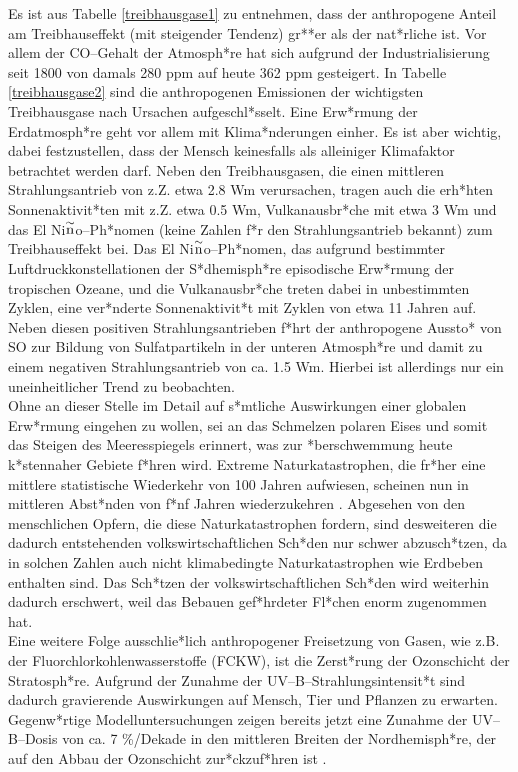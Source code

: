 Es ist aus Tabelle \ref{treibhausgase1} zu entnehmen, dass der
anthropogene Anteil am Treibhauseffekt (mit steigender Tendenz)
gr**er als der nat*rliche ist. Vor allem der CO--Gehalt
der Atmosph*re hat sich aufgrund der Industrialisierung seit 1800
von damals 280 ppm auf heute 362 ppm gesteigert. In Tabelle
\ref{treibhausgase2} sind die anthropogenen Emissionen der
wichtigsten Treibhausgase nach Ursachen aufgeschl*sselt. Eine
Erw*rmung der Erdatmosph*re geht vor allem mit Klima*nderungen
einher. Es ist aber wichtig, dabei festzustellen, dass der Mensch
keinesfalls als alleiniger Klimafaktor betrachtet werden darf.
Neben den Treibhausgasen, die einen mittleren Strahlungsantrieb
von z.Z. etwa 2.8 Wm verursachen, tragen auch die erh*hten
Sonnenaktivit*ten mit z.Z. etwa 0.5 Wm, Vulkanausbr*che mit
etwa 3 Wm und das El Ni$\rm \stackrel{\sim}{n}$o--Ph*nomen
(keine Zahlen f*r den Strahlungsantrieb bekannt) zum
Treibhauseffekt bei. Das El Ni$\rm \stackrel{\sim}{n}$o--Ph*nomen,
das aufgrund bestimmter Luftdruckkonstellationen der S*dhemisph*re
episodische Erw*rmung der tropischen Ozeane, und die
Vulkanausbr*che treten dabei in unbestimmten Zyklen, eine
ver*nderte Sonnenaktivit*t mit Zyklen von etwa 11 Jahren auf.
Neben diesen positiven Strahlungsantrieben f*hrt der anthropogene
Aussto* von SO zur Bildung von Sulfatpartikeln in der
unteren Atmosph*re und damit zu einem negativen Strahlungsantrieb
von ca. 1.5 Wm. Hierbei ist allerdings nur ein
uneinheitlicher Trend zu beobachten.\\

Ohne an dieser Stelle im Detail auf s*mtliche Auswirkungen einer
globalen Erw*rmung eingehen zu wollen, sei an das Schmelzen
polaren Eises und somit das Steigen des Meeresspiegels erinnert,
was zur *berschwemmung heute k*stennaher Gebiete f*hren wird.
Extreme Naturkatastrophen, die fr*her eine mittlere statistische
Wiederkehr von 100 Jahren aufwiesen, scheinen nun in mittleren
Abst*nden von f*nf Jahren wiederzukehren \cite{caspary98}.
Abgesehen von den menschlichen Opfern, die diese Naturkatastrophen
fordern, sind desweiteren die dadurch entstehenden
volkswirtschaftlichen Sch*den nur schwer abzusch*tzen, da in
solchen Zahlen auch nicht klimabedingte Naturkatastrophen wie
Erdbeben enthalten sind. Das Sch*tzen der volkswirtschaftlichen
Sch*den wird weiterhin dadurch erschwert, weil das Bebauen
gef*hrdeter Fl*chen enorm zugenommen hat.\\

Eine weitere Folge ausschlie*lich anthropogener Freisetzung von
Gasen, wie z.B. der Fluorchlorkohlenwasserstoffe (FCKW), ist die
Zerst*rung der Ozonschicht der Stratosph*re. Aufgrund der Zunahme
der UV--B--Strahlungsintensit*t sind dadurch gravierende
Auswirkungen auf Mensch, Tier und Pflanzen zu erwarten.
Gegenw*rtige Modelluntersuchungen zeigen bereits jetzt eine
Zunahme der UV--B--Dosis von ca. 7 \%/Dekade in den mittleren
Breiten der Nordhemisph*re, der auf den Abbau der Ozonschicht
zur*ckzuf*hren ist \cite{seinfeld98}.\\

